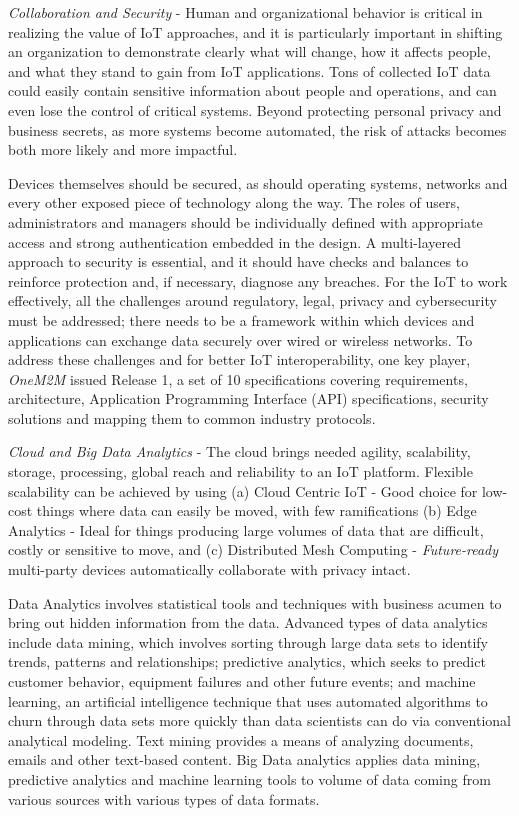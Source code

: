 \documentclass[sigconf]{acmart}
\begin{document}
{\em Collaboration and Security} - Human and organizational behavior is critical in realizing the value of IoT approaches, and it is particularly important in shifting an organization to demonstrate clearly what will change, how it affects people, and what they stand to gain from IoT applications. Tons of collected IoT data could easily contain sensitive information about people and operations, and can even lose the control of critical systems. Beyond protecting personal privacy and business secrets, as more systems become automated, the risk of attacks becomes both more likely and more impactful. 

Devices themselves should be secured, as should operating systems, networks and every other exposed piece of technology along the way. The roles of users, administrators and managers should be individually defined with appropriate access and strong authentication embedded in the design. A multi-layered approach to security is essential, and it should have checks and balances to reinforce protection and, if necessary, diagnose any breaches. For the IoT to work effectively, all the challenges around regulatory, legal, privacy and cybersecurity must be addressed; there needs to be a framework within which devices and applications can exchange data securely over wired or wireless networks. To address these challenges and for better IoT interoperability, one key player, {\em OneM2M} issued Release 1, a set of 10 specifications covering requirements, architecture, Application Programming Interface (API) specifications, security solutions and mapping them to common industry protocols\cite{6_OneM2M}.

{\em Cloud and Big Data Analytics} - The cloud brings needed agility, scalability, storage, processing, global reach and reliability to an IoT platform. Flexible scalability can be achieved by using (a) Cloud Centric IoT - Good choice for low-cost things where data can easily be moved, with few ramifications (b) Edge Analytics - Ideal for things producing large volumes of data that are difficult, costly or sensitive to move, and (c) Distributed Mesh Computing - {\em Future-ready} multi-party devices automatically collaborate with privacy intact. 

Data Analytics involves statistical tools and techniques with business acumen to bring out hidden information from the data. Advanced types of data analytics include data mining, which involves sorting through large data sets to identify trends, patterns and relationships; predictive analytics, which seeks to predict customer behavior, equipment failures and other future events; and machine learning, an artificial intelligence technique that uses automated algorithms to churn through data sets more quickly than data scientists can do via conventional analytical modeling. Text mining provides a means of analyzing documents, emails and other text-based content. Big Data analytics applies data mining, predictive analytics and machine learning tools to volume of data coming from various sources with various types of data formats. 
\end{document}
